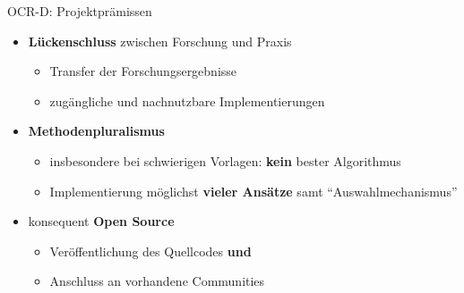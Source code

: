 \documentclass{bbawslides}
\begin{document}
\begin{bbawslide}{OCR-D: Projektprämissen}
  \vspace*{7mm}%
  \centerslidestrue%
  \begin{itemize}
    \item \textbf{Lückenschluss} zwischen Forschung und Praxis
    \begin{itemize}\small
      \item Transfer der Forschungsergebnisse
      \item zugängliche und nachnutzbare Implementierungen
    \end{itemize}
    \item \textbf{Methodenpluralismus}
    \begin{itemize}\small
      \item insbesondere bei schwierigen Vorlagen: \textbf{kein} bester Algorithmus
      \item Implementierung möglichst \textbf{vieler Ansätze} samt \enquote{Auswahlmechanismus}
    \end{itemize}
    \item konsequent \textbf{Open Source}
    \begin{itemize}\small
      \item Veröffentlichung des Quellcodes \textbf{und}
      \item Anschluss an vorhandene Communities
    \end{itemize}
  \end{itemize}
\end{bbawslide}
\end{document}
